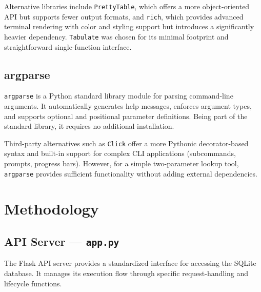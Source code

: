 \documentclass[a4paper,12pt]{report}
\begin{document}
Alternative libraries include \texttt{PrettyTable}, which offers a more object-oriented API but supports fewer output formats, and \texttt{rich}, which provides advanced terminal rendering with color and styling support but introduces a significantly heavier dependency. \texttt{Tabulate} was chosen for its minimal footprint and straightforward single-function interface.

\subsection{argparse}

\texttt{argparse} is a Python standard library module for parsing command-line arguments. It automatically generates help messages, enforces argument types, and supports optional and positional parameter definitions. Being part of the standard library, it requires no additional installation.

Third-party alternatives such as \texttt{Click} offer a more Pythonic decorator-based syntax and built-in support for complex CLI applications (subcommands, prompts, progress bars). However, for a simple two-parameter lookup tool, \texttt{argparse} provides sufficient functionality without adding external dependencies.

\section{Methodology}

\subsection{API Server --- \texttt{app.py}}

The Flask API server provides a standardized interface for accessing the SQLite database. It manages its execution flow through specific request-handling and lifecycle functions.
\end{document}
